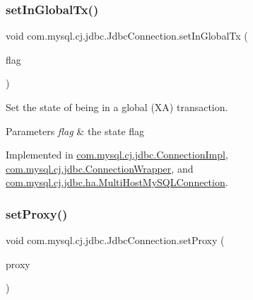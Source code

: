 \mbox{\label{interfacecom_1_1mysql_1_1cj_1_1jdbc_1_1_jdbc_connection_af7cff3ba67d2b787b04c3eff40f9e087}} 
\subsubsection{\texorpdfstring{set\+In\+Global\+Tx()}{setInGlobalTx()}}
{\footnotesize\ttfamily void com.\+mysql.\+cj.\+jdbc.\+Jdbc\+Connection.\+set\+In\+Global\+Tx (\begin{DoxyParamCaption}\item[{boolean}]{flag }\end{DoxyParamCaption})}

Set the state of being in a global (XA) transaction.


\begin{DoxyParams}{Parameters}
{\em flag} & the state flag \\
\hline
\end{DoxyParams}


Implemented in \mbox{\hyperlink{classcom_1_1mysql_1_1cj_1_1jdbc_1_1_connection_impl_a70a08ce7c0dea524a32a245986fb1531}{com.\+mysql.\+cj.\+jdbc.\+Connection\+Impl}}, \mbox{\hyperlink{classcom_1_1mysql_1_1cj_1_1jdbc_1_1_connection_wrapper_adb320c4558060ee9dae32dc4d4310beb}{com.\+mysql.\+cj.\+jdbc.\+Connection\+Wrapper}}, and \mbox{\hyperlink{classcom_1_1mysql_1_1cj_1_1jdbc_1_1ha_1_1_multi_host_my_s_q_l_connection_a317920d3dc1f80c789676ad3391135bc}{com.\+mysql.\+cj.\+jdbc.\+ha.\+Multi\+Host\+My\+S\+Q\+L\+Connection}}.

\mbox{\label{interfacecom_1_1mysql_1_1cj_1_1jdbc_1_1_jdbc_connection_a48162c9f0bf249804ae60cb7404cd0f8}} 
\subsubsection{\texorpdfstring{set\+Proxy()}{setProxy()}}
{\footnotesize\ttfamily void com.\+mysql.\+cj.\+jdbc.\+Jdbc\+Connection.\+set\+Proxy (\begin{DoxyParamCaption}\item[{\mbox{\hyperlink{interfacecom_1_1mysql_1_1cj_1_1jdbc_1_1_jdbc_connection}{Jdbc\+Connection}}}]{proxy }\end{DoxyParamCaption})}



